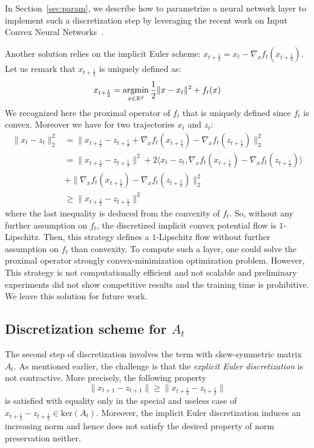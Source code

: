 In Section~\ref{sec:param}, we describe how to parametrize a neural network layer to implement such a discretization step by leveraging the recent work on Input Convex Neural Networks~\cite{amos2017input}. 

\begin{rmq}
Another solution relies on the implicit Euler scheme: $ x_{t+\frac12} = x_{t}-\nabla_xf_{t}(x_{t+\frac12})$. Let us remark that $x_{t+\frac12}$ is uniquely defined as:
\begin{align*}
 x_{t+\frac12} =\operatorname*{argmin}_{x\in\mathbb{R}^d} \frac 12\lVert x-x_t\rVert^2+ f_t(x)  
\end{align*}
We recognized here the proximal operator of $f_t$ that is uniquely defined since $f_t$ is convex. Moreover we have for two trajectories $x_t$ and $z_t$:
\begin{align*}
   \lVert x_t-z_t\rVert^2_2& =  \lVert x_{t+\frac12}-z_{t+\frac12} +\nabla_xf_{t}(x_{t+\frac12})-\nabla_xf_{t}(z_{t+\frac12}) \rVert^2_2 \\
   &=  \lVert x_{t+\frac12}-z_{t+\frac12}\rVert^2 + 2\langle x_t-z_t,\nabla_xf_{t}(x_{t+\frac12})-\nabla_xf_{t}(z_{t+\frac12})\rangle \\
   &+\lVert\nabla_xf_{t}(x_{t+\frac12})-\nabla_xf_{t}(z_{t+\frac12}) \rVert^2_2 \\
   &\geq  \lVert x_{t+\frac12}-z_{t+\frac12}\rVert^2 
\end{align*}
where the last inequality is deduced from the convexity of $f_t$. So, without any further assumption on $f_t$, the discretized implicit convex potential flow is $1$-Lipschitz. Then, this strategy defines a $1$-Lipschitz flow without further assumption on $f_t$ than convexity. To compute such a layer, one could solve the proximal operator strongly convex-minimization optimization problem. However, This strategy is not computationally efficient and not scalable and preliminary experiments did not show competitive results and the training time is prohibitive. We leave this solution for future work. 

\end{rmq}
\subsection{Discretization scheme for $A_t$}

The second step of discretization involves the term with skew-symmetric matrix $A_t$. As mentioned earlier, the challenge is that the \emph{explicit Euler discretization} is not contractive. More precisely,  the following property 
$$\lVert x_{t+1} - z_{t+1}\rVert\geq \lVert x_{t+\frac12} - z_{t+\frac12}\rVert$$ 
is satisfied with equality only in the special and useless case of $x_{t+\frac12} - z_{t+\frac12} \in \text{ker}(A_t)$. Moreover, the implicit Euler discretization induces an increasing norm and hence does not satisfy the desired property of norm preservation neither. 

